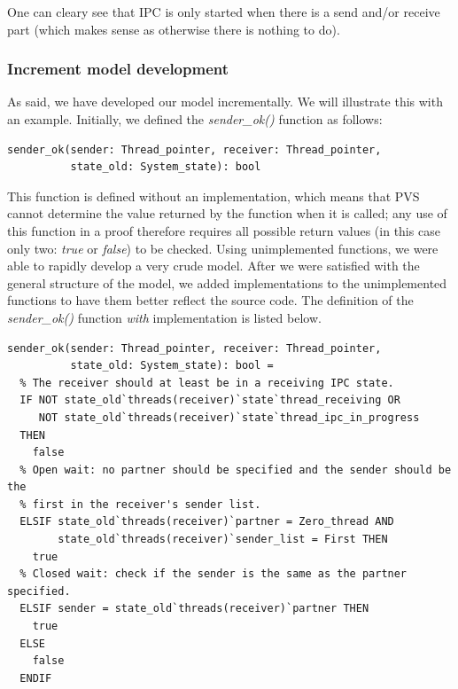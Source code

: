 One can cleary see that IPC is only started when there is a send and/or receive part (which makes sense as otherwise there is nothing to do).

\subsubsection{Increment model development}
As said, we have developed our model incrementally. We will illustrate this with an example. Initially, we defined the \emph{sender\_ok()} function as follows:

\lstset{language=PVS}
\begin{lstlisting}[caption={PVS: \emph{sender\_ok()} function without implementation.}]
% Indicates if a partner is ready for a sender.
sender_ok(sender: Thread_pointer, receiver: Thread_pointer,
          state_old: System_state): bool 
\end{lstlisting}

This function is defined without an implementation, which means that PVS cannot determine the value returned by the function when it is called; any use of this function in a proof therefore requires all possible return values (in this case only two: \emph{true} or \emph{false}) to be checked. Using unimplemented functions, we were able to rapidly develop a very crude model. After we were satisfied with the general structure of the model, we added implementations to the unimplemented functions to have them better reflect the source code. The definition of the \emph{sender\_ok()} function \textit{with} implementation is listed below.

\lstset{language=PVS}
\begin{lstlisting}[caption={PVS: \emph{sender\_ok()} function.}]
% Indicates if a partner is ready for a sender.
sender_ok(sender: Thread_pointer, receiver: Thread_pointer,
          state_old: System_state): bool =
  % The receiver should at least be in a receiving IPC state.
  IF NOT state_old`threads(receiver)`state`thread_receiving OR
     NOT state_old`threads(receiver)`state`thread_ipc_in_progress
  THEN
    false
  % Open wait: no partner should be specified and the sender should be the 
  % first in the receiver's sender list.
  ELSIF state_old`threads(receiver)`partner = Zero_thread AND
        state_old`threads(receiver)`sender_list = First THEN 
    true
  % Closed wait: check if the sender is the same as the partner specified.
  ELSIF sender = state_old`threads(receiver)`partner THEN
    true
  ELSE
    false
  ENDIF
\end{lstlisting}

